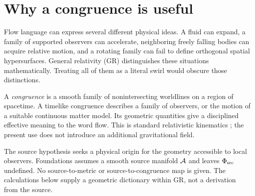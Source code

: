\documentclass[11pt]{article}
\begin{document}

\section{Why a congruence is useful}
Flow language can express several different physical ideas. A fluid can expand, a family of supported observers can accelerate, neighboring freely falling bodies can acquire relative motion, and a rotating family can fail to define orthogonal spatial hypersurfaces. General relativity (GR) distinguishes these situations mathematically. Treating all of them as a literal swirl would obscure those distinctions.

A \emph{congruence} is a smooth family of nonintersecting worldlines on a region of spacetime. A timelike congruence describes a family of observers, or the motion of a suitable continuous matter model. Its geometric quantities give a disciplined effective meaning to the word flow. This is standard relativistic kinematics \parencite{Raychaudhuri1955,EllisVanElst1999}; the present use does not introduce an additional gravitational field.

The source hypothesis seeks a physical origin for the geometry accessible to local observers. Foundations assumes a smooth source manifold $\mathcal A$ and leaves $\Phi_{\mathrm{src}}$ undefined. No source-to-metric or source-to-congruence map is given. The calculations below supply a geometric dictionary within GR, not a derivation from the source.
\end{document}
